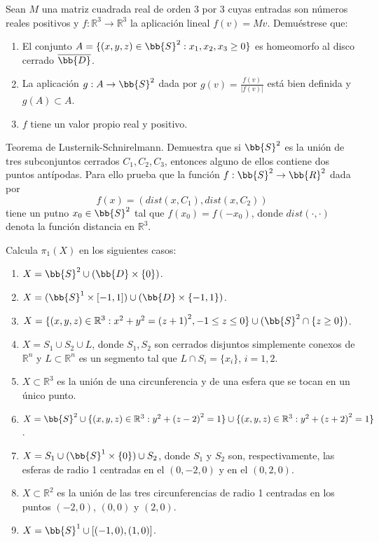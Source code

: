 \begin{ejercicio}
    Sean $M$ una matriz cuadrada real de orden 3 por 3 cuyas entradas son números reales positivos
    y $f:\mathbb{R}^3\to \mathbb{R}^3$ la aplicación lineal $f(v)=Mv$. Demuéstrese que:
    \begin{enumerate}[label=\alph*)]
        \item El conjunto $A=\{(x,y,z)\in \bb{S}^2:x_1,x_2,x_3\geq 0\}$ es homeomorfo al disco cerrado $\overline{\bb{D}}$.
        \item La aplicación $g:A\to \bb{S}^2$ dada por $g(v) = \frac{f(v)}{|f(v)|}$ está bien definida y $g(A)\subset A$.
        \item $f$ tiene un valor propio real y positivo.
    \end{enumerate}
\end{ejercicio}

\begin{ejercicio}
    Teorema de Lusternik-Schnirelmann. Demuestra que si $\bb{S}^2$ es la unión de tres subconjuntos cerrados $C_1,C_2,C_3$, entonces alguno de ellos contiene dos puntos antípodas. Para ello prueba que la función $f:\bb{S}^2\to \bb{R}^2$ dada por
    \begin{equation*}
        f(x) = (dist(x,C_1), dist(x,C_2))
    \end{equation*}
    tiene un putno $x_0\in \bb{S}^2$ tal que $f(x_0) = f(-x_0)$, donde $dist(\cdot ,\cdot )$ denota la función distancia en $\mathbb{R}^3$.
\end{ejercicio}

\begin{ejercicio}
    Calcula $\pi_1(X)$ en los siguientes casos:
    \begin{enumerate}[label=\alph*)]
        \item $X=\bb{S}^2 \cup (\bb{D}\times \{0\})$.
        \item $X=(\bb{S}^1 \times [-1,1])\cup (\bb{D}\times \{-1,1\})$.
        \item $X = \{(x,y,z)\in \mathbb{R}^3 : x^2+y^2 = {(z+1)}^{2}, -1\leq z\leq 0\}\cup (\bb{S}^2 \cap \{z\geq 0\})$.
        \item $X = S_1 \cup S_2 \cup L$, donde $S_1,S_2$ son cerrados disjuntos simplemente conexos de $\mathbb{R}^n$ y $L\subset \mathbb{R}^n$ es un segmento tal que $L\cap S_i =\{x_i\}$, $i = 1,2$.
        \item $X\subset \mathbb{R}^3$ es la unión de una circunferencia y de una esfera que se tocan en un único punto.
        \item $X = \bb{S}^2\cup \{(x,y,z)\in \mathbb{R}^3 : y^2 + {(z-2)}^{2} = 1\}\cup \{(x,y,z)\in \mathbb{R}^3 : y^2 + {(z+2)}^{2}=1\}$.
        \item $X = S_1 \cup (\bb{S}^1 \times \{0\})\cup S_2$, donde $S_1$ y $S_2$ son, respectivamente, las esferas de radio 1 centradas en el $(0,-2,0)$ y en el $(0,2,0)$.
        \item $X\subset \mathbb{R}^2$ es la unión de las tres circunferencias de radio 1 centradas en los puntos $(-2,0)$, $(0,0)$ y $(2,0)$.
        \item $X = \bb{S}^1\cup [(-1,0), (1,0)]$.
    \end{enumerate}
\end{ejercicio}

